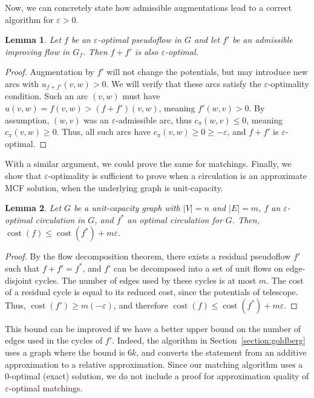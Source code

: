 \documentclass[11pt]{article}
\def\eps{\varepsilon}
\theoremstyle{plain}
\newtheorem{lemma}{Lemma}
\def\cost{\operatorname{cost}}
\begin{document}
Now, we can concretely state how admissible augmentations lead to a correct 
algorithm for $\eps > 0$.
\begin{lemma}
	Let $f$ be an $\eps$-optimal pseudoflow in $G$ and let $f'$ be an 
	admissible improving flow in $G_f$.
	Then $f + f'$ is also $\eps$-optimal.
\end{lemma}
\begin{proof}
	Augmentation by $f'$ will not change the potentials, but may introduce
	new arcs with $u_{f+f'}(v, w) > 0$.
	We will verify that these arcs satisfy the $\eps$-optimality condition.
	Such an arc $(v, w)$ must have $u(v, w) = f(v, w) > (f+f')(v, w)$, 
	meaning $f'(w, v) > 0$.
	By assumption, $(w, v)$ was an $\eps$-admissible arc, thus
	$c_\pi(w, v) \leq 0$, meaning $c_\pi(v, w) \geq 0$.
	Thus, all such arcs have $c_\pi(v, w) \geq 0 \geq -\eps$, and $f + f'$
	is $\eps$-optimal.
\end{proof}

With a similar argument, we could prove the same for matchings.
Finally, we show that $\eps$-optimality is sufficient to prove when a 
circulation is an approximate MCF solution, when the underlying graph is 
unit-capacity.

\begin{lemma}
\label{lemma:mcf_cost}
	Let $G$ be a unit-capacity graph with $|V| = n$ and $|E| = m$,
	$f$ an $\eps$-optimal circulation in $G$, and $f^*$ an optimal 
	circulation for $G$.
	Then, $\cost(f) \leq \cost(f^*) + m\eps$.
\end{lemma}
\begin{proof}
	By the flow decomposition theorem, there exists a residual pseudoflow 
	$f'$ such that $f + f' = f^*$, and $f'$ can be decomposed into a set of 
	unit flows on edge-disjoint cycles.
	The number of edges used by these cycles is at most $m$.
	The cost of a residual cycle is equal to its reduced cost, since the 
	potentials of telescope.
	Thus, $\cost(f') \geq m(-\eps)$, and therefore 
	$\cost(f) \leq \cost(f^*) + m\eps$.
\end{proof}

This bound can be improved if we have a better upper bound on the number of 
edges used in the cycles of $f'$.
Indeed, the algorithm in Section~\ref{section:goldberg} uses a graph where the
bound is $6k$, and converts the statement from an additive approximation to a 
relative approximation.
Since our matching algorithm uses a 0-optimal (exact) solution, we do not 
include a proof for approximation quality of $\eps$-optimal matchings.
\end{document}

